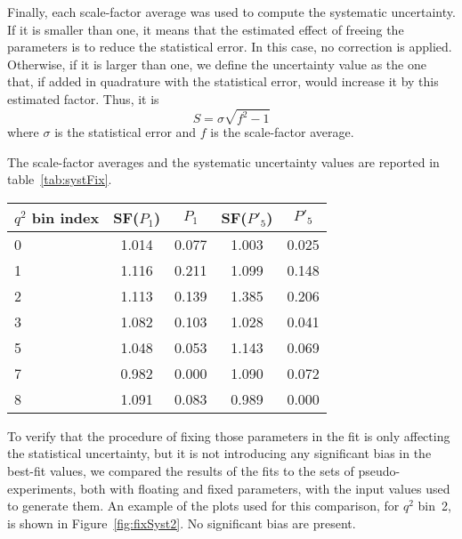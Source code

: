 Finally, each scale-factor average was used to compute the systematic uncertainty.
If it is smaller than one, it means that the estimated effect of freeing the parameters is to reduce the statistical error.
In this case, no correction is applied.
Otherwise, if it is larger than one, we define the uncertainty value as the one that, if added in quadrature with the statistical error, would increase it by this estimated factor.
Thus, it is
\begin{equation} \label{eq:fix.syst.def}
S = \sigma \sqrt{f^2-1}
\end{equation}
where $\sigma$ is the statistical error and $f$ is the scale-factor average.


The scale-factor averages and the systematic uncertainty values are reported in table~\ref{tab:systFix}.

\begin{table*}[!htb]
  \caption{Scale-factor average values and systematic uncertainties computed to compensate the statistical error reduction introduced fixing some PDF parameters\label{tab:systFix}}
  \begin{center}
    \begin{tabular}{l|cc|cc}
      $q^2$ bin index & SF($P_1$)  & $P_1$  & SF($P'_5$) & $P'_5$ \\
      \hline
      0 & 1.014 & 0.077 & 1.003 & 0.025  \\
      1 & 1.116 & 0.211 & 1.099 & 0.148  \\
      2 & 1.113 & 0.139 & 1.385 & 0.206  \\
      3 & 1.082 & 0.103 & 1.028 & 0.041  \\
      5 & 1.048 & 0.053 & 1.143 & 0.069  \\
      7 & 0.982 & 0.000 & 1.090 & 0.072  \\
      8 & 1.091 & 0.083 & 0.989 & 0.000  \\
    \end{tabular}
  \end{center}
\end{table*}

To verify that the procedure of fixing those parameters in the fit is only affecting the statistical uncertainty, but it is not introducing any significant bias in the best-fit values, we compared the results of the fits to the sets of pseudo-experiments, both with floating and fixed parameters, with the input values used to generate them.
An example of the plots used for this comparison, for $q^2$ bin~2, is shown in Figure~\ref{fig:fixSyst2}.
No significant bias are present.

